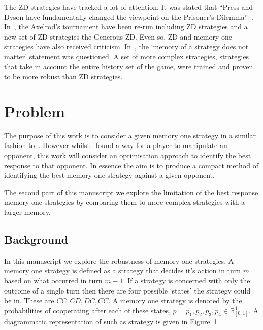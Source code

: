 \documentclass[10pt]{article}
\newcommand{\R}{\mathbb{R}}
\begin{document}
The ZD strategies have tracked a lot of attention. It was stated that
``Press and Dyson have fundamentally changed the viewpoint on the Prisoner's
Dilemma''~\cite{Stewart2012}. In~\cite{Stewart2012}, the Axelrod's
tournament have been re-run including ZD strategies and a new set of ZD
strategies the Generous ZD. Even so, ZD and memory one strategies have
also received criticism. In~\cite{Harper2015}, the `memory of a strategy does
not matter' statement was questioned. A set of more complex strategies,
strategies that take in account the entire history set of the game, were
trained and proven to be more robust than ZD strategies.

\section{Problem}

The purpose of this work is to consider a given memory one strategy 
in a similar fashion to~\cite{Press2012}. However whilst~\cite{Press2012} found
a way for a player to manipulate an opponent, this work will consider an
optimisation approach to identify the best response to that opponent.
In essence the aim is to produce a compact method of identifying the best memory
one strategy against a given opponent.

The second part of this manuscript we explore the limitation of the best response
memory one strategies by comparing them to more complex strategies with a larger
memory.

\subsection{Background}

In this manuscript we explore the robustness of memory one strategies.
A memory one strategy is defined as a strategy that decides it's action in turn
\(m\) based on what occurred in turn \(m - 1\). If a strategy is concerned with
only the outcome of a single turn then there are four possible `states' the
strategy could be in. These are \(CC, CD, DC,CC\). A memory one strategy is denoted
by the probabilities of cooperating after each of these states,
\(p=p_1, p_2, p_3, p_4 \in \R_{[0,1]} ^ 4\). A diagrammatic representation of
such as strategy is given in Figure~\ref{fig:diagram_mem_one}.

\begin{figure}
    \centering
    \begin{subfigure}{0.45\textwidth}
        \centering
        
        \label{fig:diagram_mem_one}
    \end{subfigure}
    \begin{subfigure}{0.45\textwidth}
        \centering
        
        \label{fig:markov_chain}
    \end{subfigure}
\end{figure}
\end{document}
